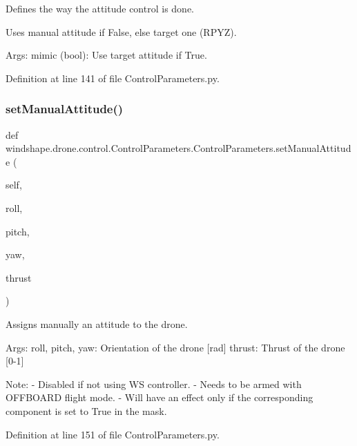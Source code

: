 \begin{DoxyVerb}Defines the way the attitude control is done.

Uses manual attitude if False, else target one (RPYZ).

Args:
    mimic (bool): Use target attitude if True.
\end{DoxyVerb}
 

Definition at line 141 of file Control\+Parameters.\+py.

\mbox{\label{classwindshape_1_1drone_1_1control_1_1_control_parameters_1_1_control_parameters_a8beda428d67c6d6f9463492048f6f096}} 
\subsubsection{\texorpdfstring{set\+Manual\+Attitude()}{setManualAttitude()}}
{\footnotesize\ttfamily def windshape.\+drone.\+control.\+Control\+Parameters.\+Control\+Parameters.\+set\+Manual\+Attitude (\begin{DoxyParamCaption}\item[{}]{self,  }\item[{}]{roll,  }\item[{}]{pitch,  }\item[{}]{yaw,  }\item[{}]{thrust }\end{DoxyParamCaption})}

\begin{DoxyVerb}Assigns manually an attitude to the drone.

Args:
    roll, pitch, yaw: Orientation of the drone [rad]
    thrust: Thrust of the drone [0-1]
    
Note:
    - Disabled if not using WS controller.
    - Needs to be armed with OFFBOARD flight mode.
    - Will have an effect only if the corresponding component is
set to True in the mask.
\end{DoxyVerb}
 

Definition at line 151 of file Control\+Parameters.\+py.

